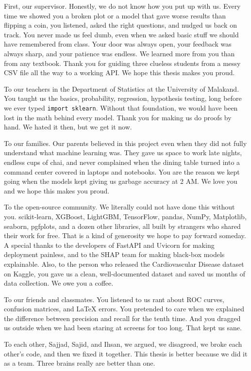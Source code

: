 \documentclass[12pt, a4paper, oneside]{book}
\begin{document}
First, our supervisor. Honestly, we do not know how you put up with us. Every time we showed you a broken plot or a model that gave worse results than flipping a coin, you listened, asked the right questions, and nudged us back on track. You never made us feel dumb, even when we asked basic stuff we should have remembered from class. Your door was always open, your feedback was always sharp, and your patience was endless. We learned more from you than from any textbook. Thank you for guiding three clueless students from a messy CSV file all the way to a working API. We hope this thesis makes you proud.

To our teachers in the Department of Statistics at the University of Malakand. You taught us the basics, probability, regression, hypothesis testing, long before we ever typed \texttt{import sklearn}. Without that foundation, we would have been lost in the math behind every model. Thank you for making us do proofs by hand. We hated it then, but we get it now.

To our families. Our parents believed in this project even when they did not fully understand what machine learning was. They gave us space to work late nights, endless cups of chai, and never complained when the dining table turned into a command center covered in laptops and notebooks. You are the reason we kept going when the models kept giving us garbage accuracy at 2 AM. We love you and we hope this makes you proud.

To the open-source community. We literally could not have done this without you. scikit-learn, XGBoost, LightGBM, TensorFlow, pandas, NumPy, Matplotlib, seaborn, pgfplots, and a dozen other libraries, all built by strangers who shared their work for free. That is a kind of generosity we hope to pay forward someday. A special thanks to the developers of FastAPI and Uvicorn for making deployment painless, and to the SHAP team for making black-box models explainable. Also, to the person who released the Cardiovascular Disease dataset on Kaggle, you gave us a clean, well-documented dataset and saved us months of data collection. We owe you a coffee.

To our friends and classmates. You listened to us rant about ROC curves, confusion matrices, and LaTeX errors. You pretended to care when we explained the difference between precision and recall for the tenth time. And you dragged us outside when we had been staring at screens for too long. That kept us sane.

To each other, Sajjad, Sajid, and Ihsan, we argued, we disagreed, we broke each other's code, and then we fixed it together. This thesis is better because we did it as a team. Three brains really are better than one.
\end{document}

